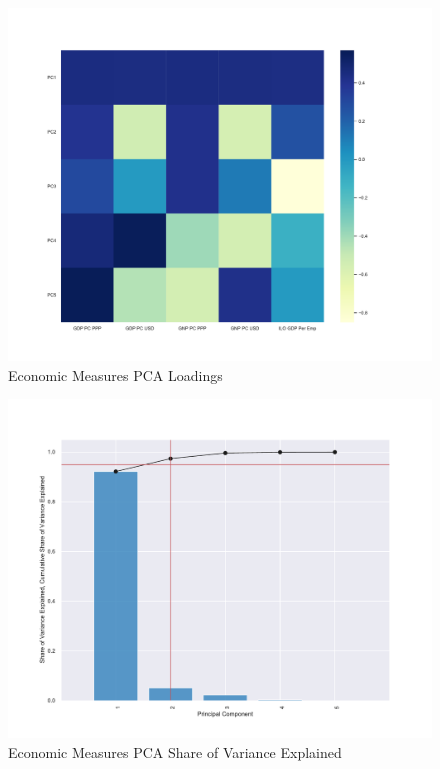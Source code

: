 \documentclass[10pt]{article}
\begin{document}
        \begin{figure}[H]
            \centering
            \caption{Economic Measures PCA Loadings}
            \label{Econ_Loadings}	
            \includegraphics[width=\linewidth,keepaspectratio=true]{../Output/Figures/Econ_Indicator_Loadings_wb_only_short.pdf}
        \end{figure}

        \begin{figure}[H]
            \centering
            \caption{Economic Measures PCA Share of Variance Explained}
            \label{Econ_Share_Explained}	
            \includegraphics[width=\linewidth,keepaspectratio=true]{../Output/Figures/Econ_Indicator_Share_Explained_wb_only_short.pdf}
        \end{figure}
\end{document}
